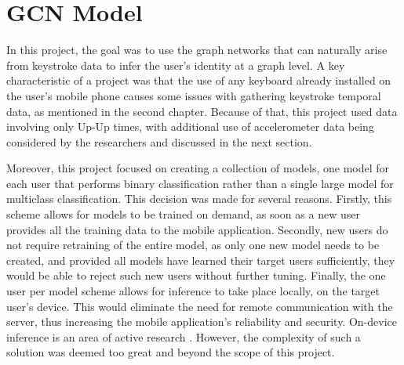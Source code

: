 \chapter{GCN Model}

In this project, the goal was to use the graph networks that can naturally arise from keystroke data to infer the user's identity at a graph level. A key characteristic of a project was that the use of any keyboard already installed on the user's mobile phone causes some issues with gathering keystroke temporal data, as mentioned in the second chapter. Because of that, this project used data involving only Up-Up times, with additional use of accelerometer data being considered by the researchers and discussed in the next section.

Moreover, this project focused on creating a collection of models, one model for each user that performs binary classification rather than a single large model for multiclass classification. This decision was made for several reasons. Firstly, this scheme allows for models to be trained on demand, as soon as a new user provides all the training data to the mobile application. Secondly, new users do not require retraining of the entire model, as only one new model needs to be created, and provided all models have learned their target users sufficiently, they would be able to reject such new users without further tuning. Finally, the one user per model scheme allows for inference to take place locally, on the target user's device. This would eliminate the need for remote communication with the server, thus increasing the mobile application's reliability and security. On-device inference is an area of active research \cite{48305}. However, the complexity of such a solution was deemed too great and beyond the scope of this project.
